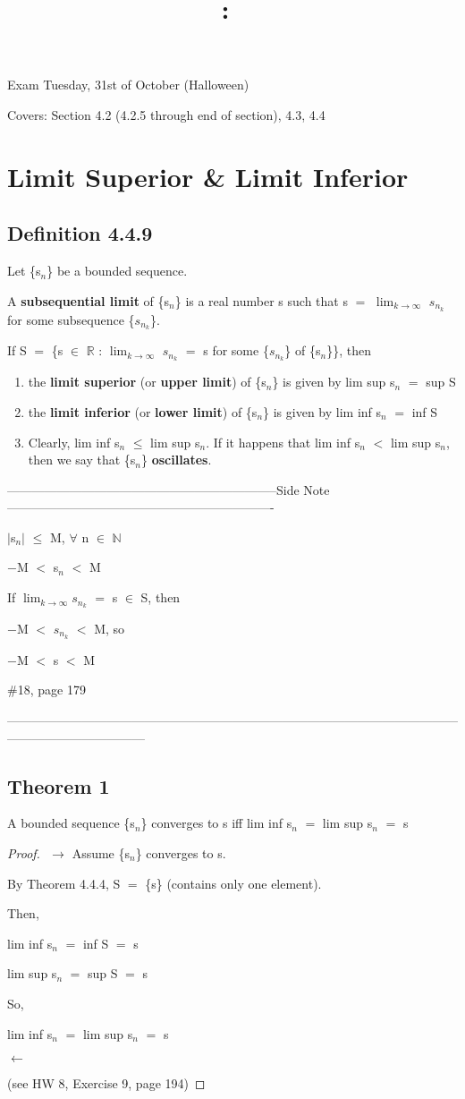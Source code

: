 \documentclass{article}
\title{
    \vspace{2in}
    \textmd{\textbf{\hmwkClass:\ \hmwkTitle}}\\
    \normalsize\vspace{0.1in}\small\vspace{0.1in}\large{\textit{\hmwkClassInstructor}}
    \vspace{3in}
}
\author{\hmwkAuthorName}
\date{}
\newcommand{\mt}[1]{\ensuremath{#1}}
\newcommand\bsc[2][\DefaultOpt]{%
  \def\DefaultOpt{#2}%
  \section[#1]{#2}%
}
\newcommand\ssc[2][\DefaultOpt]{%
  \def\DefaultOpt{#2}%
  \subsection[#1]{#2}%
}
\newcommand{\bgpf}{\begin{proof} $ $\newline}
\newcommand{\balist}{\begin{enumerate}[label=\alph*.]}
\newcommand{\elist}{\end{enumerate}}
\newcommand{\epf}{\end{proof}}
\newcommand{\dbs}[3]{\mt{#1_{#2_#3}}}
\newcommand{\sidenote}[1]{-----------------------------------------------------------------Side Note----------------------------------------------------------------
#1 \

---------------------------------------------------------------------------------------------------------------------------------------------}
\newcommand{\br}{\mt{\mathbb{R}} }       %
\newcommand{\bn}{\mt{\mathbb{N}} }       %
\newcommand{\fa}{\mt{\forall} }          %
\newcommand{\mem}{\mt{\in} }
\newcommand{\lra}{ \mt{\longrightarrow} } %
\newcommand{\lla}{ \mt{\longleftarrow} }  %
\newcommand{\av}[1]{\mt{|}#1\mt{|}}  %
\newcommand{\bk}[1]{\{#1\}}
\newcommand{\ls}{\mt{<} }
\newcommand{\lse}{\mt{\leq} }
\newcommand{\eql}{\mt{=} }
\newcommand{\uw}[2]{#1\mt{_{#2}}}
\newcommand{\lmti}[1]{\mt{\displaystyle{\lim_{#1 \to \infty}}}}
\begin{document}
Exam Tuesday, 31st of October (Halloween)

Covers: Section 4.2 (4.2.5 through end of section), 4.3, 4.4

\bsc{Limit Superior \& Limit Inferior}{

\ssc{Definition 4.4.9}{

Let \bk{\uw{s}{n}} be a bounded sequence.

A \textbf{subsequential limit} of \bk{\uw{s}{n}} is a real number s such that s \eql \lmti{k} \dbs{s}{n}{k} for some subsequence \bk{\dbs{s}{n}{k}}.

If S \eql \bk{s \mem \br : \lmti{k} \dbs{s}{n}{k} \eql s for some \bk{\dbs{s}{n}{k}} of \bk{\uw{s}{n}}}, then

\balist
\item the \textbf{limit superior} (or \textbf{upper limit}) of \bk{\uw{s}{n}} is given by lim sup \uw{s}{n} \eql sup S
\item the \textbf{limit inferior} (or \textbf{lower limit}) of \bk{\uw{s}{n}} is given by lim inf \uw{s}{n} \eql inf S
\item Clearly, lim inf \uw{s}{n} \lse lim sup \uw{s}{n}. If it happens that lim inf \uw{s}{n} \ls lim sup \uw{s}{n}, then we say that \bk{\uw{s}{n}} \textbf{oscillates}.
\elist

}

\sidenote{
\av{\uw{s}{n}} \lse M, \fa n \mem \bn

$-$M \ls \uw{s}{n} \ls M

If \lmti{k}\dbs{s}{n}{k} \eql s \mem S, then

$-$M \ls \dbs{s}{n}{k} \ls M, so

$-$M \ls s \ls M

\#18, page 179
}

\ssc{Theorem 1}{A bounded sequence \bk{\uw{s}{n}} converges to s iff lim inf \uw{s}{n} \eql lim sup \uw{s}{n} \eql s}

\bgpf
\lra 
Assume \bk{\uw{s}{n}} converges to s.

By Theorem 4.4.4, S \eql \bk{s} (contains only one element).

Then, 

lim inf \uw{s}{n} \eql inf S \eql s

lim sup \uw{s}{n} \eql sup S \eql s

So,

lim inf \uw{s}{n} \eql lim sup \uw{s}{n} \eql s

\lla 

(see HW 8, Exercise 9, page 194)



\epf
}
\end{document}

